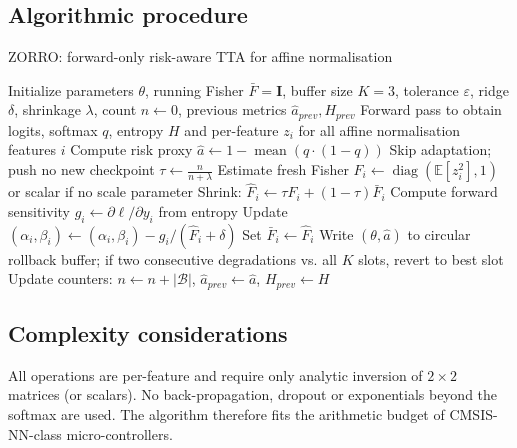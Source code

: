 \documentclass{article} %
\begin{document}
\subsection{Algorithmic procedure}
\begin{algorithm}
\caption{ZORRO: forward-only risk-aware TTA for affine normalisation}
\begin{algorithmic}[1]
\State Initialize parameters \(\theta\), running Fisher \(\bar{F}=\mathbf{I}\), buffer size \(K=3\), tolerance \(\varepsilon\), ridge \(\delta\), shrinkage \(\lambda\), count \(n\leftarrow 0\), previous metrics \(\hat{a}_{prev}, H_{prev}\)
  \State Forward pass to obtain logits, softmax \(q\), entropy \(H\) and per-feature \(z_i\) for all affine normalisation features \(i\)
  \State Compute risk proxy \(\hat{a} \leftarrow 1 - \operatorname{mean}(q\cdot(1-q))\)
     \State Skip adaptation; push no new checkpoint
  \Else
     \State \(\tau \leftarrow \frac{n}{n+\lambda}\)
        \State Estimate fresh Fisher \(F_{i} \leftarrow \operatorname{diag}(\mathbb{E}[z_i^2], 1)\) or scalar if no scale parameter
        \State Shrink: \(\hat{F}_{i} \leftarrow \tau F_{i} + (1-\tau)\bar{F}_{i}\)
        \State Compute forward sensitivity \(g_i \leftarrow \partial \ell/\partial y_i\) from entropy
        \State Update \((\alpha_i,\beta_i) \leftarrow (\alpha_i,\beta_i) - g_i/(\hat{F}_{i}+\delta)\)
        \State Set \(\bar{F}_{i} \leftarrow \hat{F}_{i}\)
     \EndFor
     \State Write \((\theta, \hat{a})\) to circular rollback buffer; if two consecutive degradations vs. all \(K\) slots, revert to best slot
  \EndIf
  \State Update counters: \(n \leftarrow n + |\mathcal{B}|\), \(\hat{a}_{prev}\leftarrow \hat{a}\), \(H_{prev}\leftarrow H\)
\EndFor
\end{algorithmic}
\end{algorithm}
\subsection{Complexity considerations}
All operations are per-feature and require only analytic inversion of \(2\times2\) matrices (or scalars). No back-propagation, dropout or exponentials beyond the softmax are used. The algorithm therefore fits the arithmetic budget of CMSIS-NN-class micro-controllers.
\end{document}
